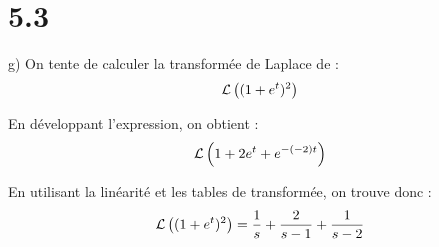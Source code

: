 \section*{5.3}

g) On tente de calculer la transformée de Laplace de :
\begin{align*}
    \mathcal{L}\left({(1+e^t)^2}\right)
\end{align*}

En développant l'expression, on obtient :
\begin{align*}
    \mathcal{L}\left({1+2e^t+e^{-(-2)t}}\right)
\end{align*}

En utilisant la linéarité et les tables de transformée, on trouve donc :
\begin{align*}
    \mathcal{L}\left({(1+e^t)^2}\right) = \dfrac{1}{s}+\dfrac{2}{s-1}+\dfrac{1}{s-2}
\end{align*}
